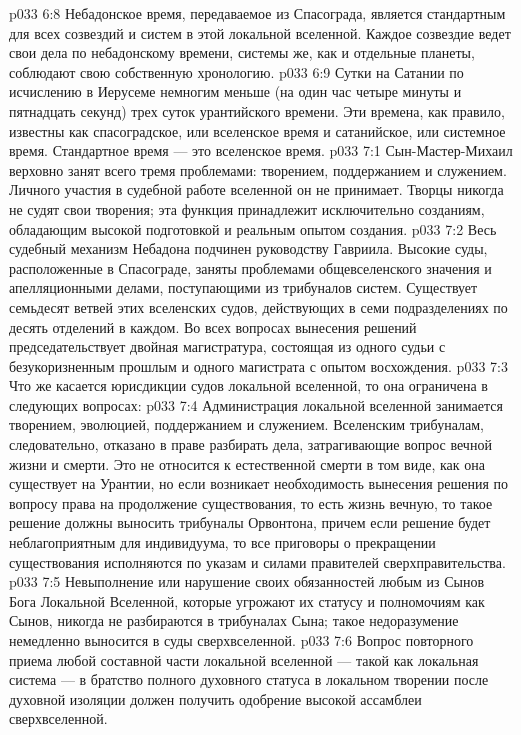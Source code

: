 \vs p033 6:8 Небадонское время, передаваемое из Спасограда, является стандартным для всех созвездий и систем в этой локальной вселенной. Каждое созвездие ведет свои дела по небадонскому времени, системы же, как и отдельные планеты, соблюдают свою собственную хронологию.
\vs p033 6:9 Сутки на Сатании по исчислению в Иерусеме немногим меньше (на один час четыре минуты и пятнадцать секунд) трех суток урантийского времени. Эти времена, как правило, известны как спасоградское, или вселенское время и сатанийское, или системное время. Стандартное время --- это вселенское время.
\vs p033 7:1 Сын\hyp{}Мастер\hyp{}Михаил верховно занят всего тремя проблемами: творением, поддержанием и служением. Личного участия в судебной работе вселенной он не принимает. Творцы никогда не судят свои творения; эта функция принадлежит исключительно созданиям, обладающим высокой подготовкой и реальным опытом создания.
\vs p033 7:2 Весь судебный механизм Небадона подчинен руководству Гавриила. Высокие суды, расположенные в Спасограде, заняты проблемами общевселенского значения и апелляционными делами, поступающими из трибуналов систем. Существует семьдесят ветвей этих вселенских судов, действующих в семи подразделениях по десять отделений в каждом. Во всех вопросах вынесения решений председательствует двойная магистратура, состоящая из одного судьи с безукоризненным прошлым и одного магистрата с опытом восхождения.
\vs p033 7:3 Что же касается юрисдикции судов локальной вселенной, то она ограничена в следующих вопросах:
\vs p033 7:4 \bibnobreakspace Администрация локальной вселенной занимается творением, эволюцией, поддержанием и служением. Вселенским трибуналам, следовательно, отказано в праве разбирать дела, затрагивающие вопрос вечной жизни и смерти. Это не относится к естественной смерти в том виде, как она существует на Урантии, но если возникает необходимость вынесения решения по вопросу права на продолжение существования, то есть жизнь вечную, то такое решение должны выносить трибуналы Орвонтона, причем если решение будет неблагоприятным для индивидуума, то все приговоры о прекращении существования исполняются по указам и силами правителей сверхправительства.
\vs p033 7:5 \pc {}\bibnobreakspace Невыполнение или нарушение своих обязанностей любым из Сынов Бога Локальной Вселенной, которые угрожают их статусу и полномочиям как Сынов, никогда не разбираются в трибуналах Сына; такое недоразумение немедленно выносится в суды сверхвселенной.
\vs p033 7:6 \pc {}\bibnobreakspace Вопрос повторного приема любой составной части локальной вселенной --- такой как локальная система --- в братство полного духовного статуса в локальном творении после духовной изоляции должен получить одобрение высокой ассамблеи сверхвселенной.
